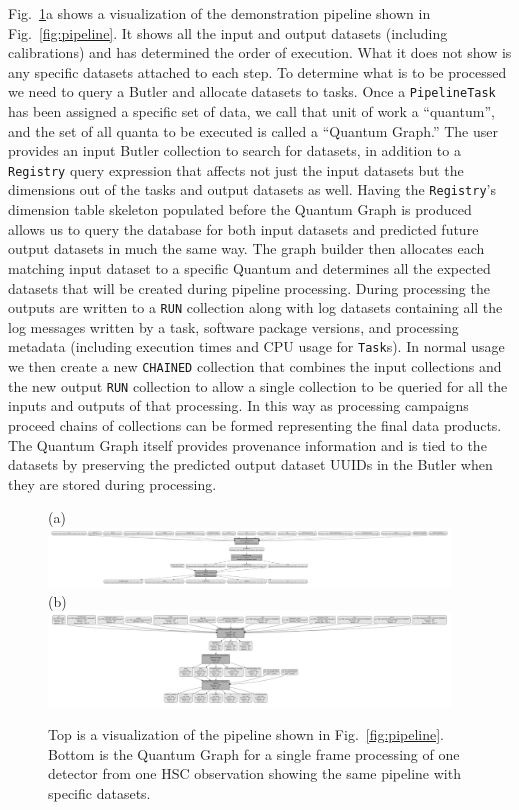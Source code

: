\documentclass[]{spie}
\begin{document}
Fig.~\ref{fig:graph}a shows a visualization of the demonstration pipeline shown in Fig.~\ref{fig:pipeline}.
It shows all the input and output datasets (including calibrations) and has determined the order of execution.
What it does not show is any specific datasets attached to each step.
To determine what is to be processed we need to query a Butler and allocate datasets to tasks.
Once a \texttt{PipelineTask} has been assigned a specific set of data, we call that unit of work a ``quantum'', and the set of all quanta to be executed is called a ``Quantum Graph.''
The user provides an input Butler collection to search for datasets, in addition to a \texttt{Registry} query expression that affects not just the input datasets but the dimensions out of the tasks and output datasets as well.
Having the \texttt{Registry}'s dimension table skeleton populated before the Quantum Graph is produced allows us to query the database for both input datasets and predicted future output datasets in much the same way.
The graph builder then allocates each matching input dataset to a specific Quantum and determines all the expected datasets that will be created during pipeline processing.
During processing the outputs are written to a \texttt{RUN} collection along with log datasets containing all the log messages written by a task, software package versions, and processing metadata (including execution times and CPU usage for \texttt{Task}s).
In normal usage we then create a new \texttt{CHAINED} collection that combines the input collections and the new output \texttt{RUN} collection to allow a single collection to be queried for all the inputs and outputs of that processing.
In this way as processing campaigns proceed chains of collections can be formed representing the final data products.
The Quantum Graph itself provides provenance information and is tied to the datasets by preserving the predicted output dataset UUIDs in the Butler when they are stored during processing.

\begin{figure}
  (a) \includegraphics[width=0.95\textwidth]{pipeline}
  (b) \includegraphics[width=0.95\textwidth]{quantum-graph}
  \caption{Top is a visualization of the pipeline shown in Fig.~\ref{fig:pipeline}. Bottom is the Quantum Graph for a single frame processing of one detector from one HSC observation showing the same pipeline with specific datasets.}
  \label{fig:graph}
  \end{figure}
\end{document}
